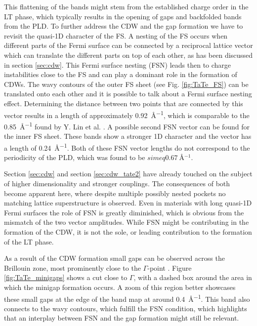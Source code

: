 This flattening of the bands might stem from the established charge order in the LT phase,  which typically results in the opening of gaps and backfolded bands from the PLD.
To further address the CDW and the gap formation we have to revisit the quasi-1D character of the FS.
A nesting of the FS occurs when different parts of the Fermi surface can be connected by a reciprocal lattice vector which can translate the different parts on top of each other, as has been discussed in section \ref{sec:cdw}.
This Fermi surface nesting (FSN) leads then to charge instabilities close to the FS and can play a dominant role in the formation of CDWs.
The wavy contours of the outer FS sheet (see Fig. \ref{fig:TaTe_FS}) can be translated onto each other and it is possible to talk about a Fermi surface nesting effect.
Determining the distance between two points that are connected by this vector results in a length of approximately \qty{0.92}{\angstrom^{-1}}, which is comparable to the \qty{0.85}{\angstrom^{-1}} found by Y. Lin et al. \cite{lin_evidence_2022}.
A possible second FSN vector can be found for the inner FS sheet.
These bands show a stronger 1D character and the vector has a length of \qty{0.24}{\angstrom^{-1}}.
Both of these FSN vector lengths do not correspond to the periodicity of the PLD, which was found to be $simeq\qty{0.67}{\angstrom^{-1}}$.

Section \ref{sec:cdw} and section \ref{sec:cdw_tate2} have already touched on the subject of higher dimensionality and stronger couplings.
The consequences of both become apparent here, where despite multiple possibly nested pockets no matching lattice superstructure is observed.
Even in materials with long quasi-1D Fermi surfaces the role of FSN is greatly diminished, which is obvious from the mismatch of the two vector amplitudes.
While FSN might be contributing in the formation of the CDW, it is not the sole, or leading contribution to the formation of the LT phase.

As a result of the CDW formation small gaps can be observed across the Brillouin zone, most prominently close to the $\Gamma$-point \cite{lin_evidence_2022}.
Figure \ref{fig:TaTe_minigaps} shows a cut close to $\Gamma$, with a dashed box around the area in which the minigap formation occurs.
A zoom of this region better showcases these small gaps at the edge of the band map at around \qty{0.4}{\angstrom^{-1}}.
This band also connects to the wavy contours, which fulfill the FSN condition, which highlights that an interplay between FSN and the gap formation might still be relevant.

